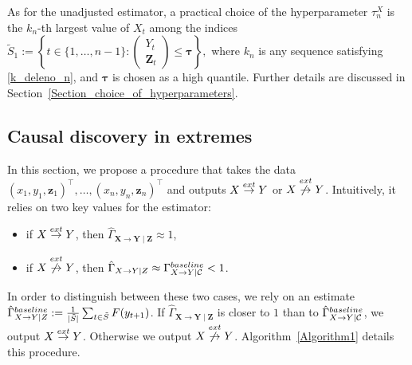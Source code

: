 \documentclass[a4paper,11pt]{article}
\newcommand{\toverset}[2]{\overset{{\rm #1}}{#2}}
\newcommand{\baseline}{{\rm baseline}}
\begin{document}
As for the unadjusted estimator, a practical choice of the hyperparameter 
\(\tau_n^X\) is the \(k_n\)-th largest value of \(X_t\) among the indices
\(
    \widetilde S_1
    :=
    \left\{
    t\in\{1,\dots,n-1\}:
    \begin{pmatrix}
        Y_t\\
        \mathbf Z_t
    \end{pmatrix}
    \leq \boldsymbol{\tau}
    \right\},
\)
where \(k_n\) is any sequence satisfying \eqref{k_deleno_n}, and
\(\boldsymbol{\tau}\) is chosen as a high quantile. Further details are
discussed in Section~\ref{Section_choice_of_hyperparameters}.

\subsection{Causal discovery in extremes}
\label{section_algorithm}
In this section, we propose a procedure that takes the data $(x_1, y_1, \textbf{z}_1)^\top, \dots, (x_n, y_n, \textbf{z}_n)^\top$ and outputs  $\textbf{X}\toverset{ext}{\to}\textbf{Y}$ or  $\textbf{X}\toverset{ext}{\not\to}\textbf{Y}$. Intuitively, it relies on two key values for the estimator: 
\begin{itemize}
    \item if $\textbf{X}\toverset{ext}{\to}\textbf{Y}$, then $\hat{\Gamma}_{\textbf{X}\to\textbf{Y}\mid\textbf{Z}}\approx 1$, 
    \item if $\textbf{X}\toverset{ext}{\not\to}\textbf{Y}$, then $\hat{\Gamma}_{\textbf{X}\to\textbf{Y}\mid\textbf{Z}}\approx  {\Gamma}_{\textbf{X}\to\textbf{Y}\mid\mathcal{C}}^{\baseline}<1$.
\end{itemize}
In order to distinguish between these two cases, we rely on an estimate  $\hat{\Gamma}_{\textbf{X}\to\textbf{Y}\mid\textbf{Z}}^{\baseline} := \frac{1}{|\tilde{S}|}\sum_{t\in \tilde{S}} F(y_{t+1})$. If $\hat{\Gamma}_{\textbf{X}\to\textbf{Y}\mid\textbf{Z}}$ is closer to $1$ than to $\hat{\Gamma}_{\textbf{X}\to\textbf{Y}\mid\mathcal{C}}^{\baseline}$, we output $\textbf{X}\toverset{ext}{\to}\textbf{Y}$. Otherwise we output $\textbf{X}\toverset{ext}{\not\to}\textbf{Y}$. 
Algorithm~\ref{Algorithm1} details this procedure. 
\end{document}
